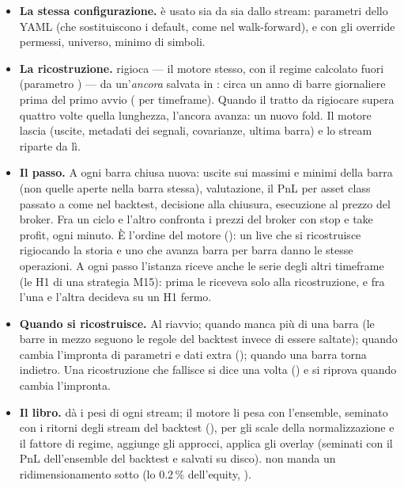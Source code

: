 \begin{itemize}
  \item \textbf{La stessa configurazione.} 
        è usato sia da  sia dallo stream: parametri
        dello YAML (che sostituiscono i default, come nel walk-forward),
         e  con gli
        override permessi, universo, minimo di simboli.
  \item \textbf{La ricostruzione.}  rigioca
         --- il motore stesso, con il regime
        calcolato fuori (parametro ) --- da un'\emph{ancora}
        salvata in : circa un anno di barre
        giornaliere prima del primo avvio ( per
        timeframe). Quando il tratto da rigiocare supera quattro volte quella
        lunghezza, l'ancora avanza: un nuovo fold. Il motore lascia
         (uscite, metadati dei segnali, covarianze,
        ultima barra) e lo stream riparte da lì.
  \item \textbf{Il passo.} A ogni barra chiusa nuova: uscite sui massimi e
        minimi della barra (non quelle aperte nella barra stessa),
        valutazione, il PnL per asset class passato a
         come nel backtest, decisione alla
        chiusura, esecuzione al prezzo del broker. Fra un ciclo e l'altro  confronta i
        prezzi del broker con stop e take profit, ogni minuto. È l'ordine del
        motore (): un live che si ricostruisce
        rigiocando la storia e uno che avanza barra per barra danno le stesse
        operazioni. A ogni passo l'istanza riceve anche le serie degli altri
        timeframe (le H1 di una strategia M15): prima le riceveva solo alla
        ricostruzione, e fra l'una e l'altra decideva su un H1 fermo.
  \item \textbf{Quando si ricostruisce.} Al riavvio; quando manca più di una
        barra (le barre in mezzo seguono le regole del backtest invece di
        essere saltate); quando cambia l'impronta di parametri e dati extra
        (); quando una barra torna indietro. Una
        ricostruzione che fallisce si dice una volta () e
        si riprova quando cambia l'impronta.
  \item \textbf{Il libro.}  dà i pesi di ogni
        stream; il motore li pesa con l'ensemble, seminato con i ritorni
        degli stream del backtest (), per gli
        scale della normalizzazione e il fattore di regime, aggiunge gli
        approcci, applica gli overlay (seminati con il PnL dell'ensemble del
        backtest e salvati su disco).  non manda un
        ridimensionamento sotto  (lo \num{0.2}\,\%
        dell'equity, ).
\end{itemize}

